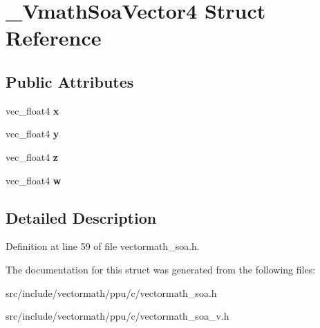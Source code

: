 \hypertarget{struct__VmathSoaVector4}{\section{\-\_\-\-Vmath\-Soa\-Vector4 Struct Reference}
\label{struct__VmathSoaVector4}
}
\subsection*{Public Attributes}
\begin{DoxyCompactItemize}
\item 
\hypertarget{struct__VmathSoaVector4_a9bbac8abd589c01962f89e317f8747fd}{vec\-\_\-float4 {\bfseries x}}\label{struct__VmathSoaVector4_a9bbac8abd589c01962f89e317f8747fd}

\item 
\hypertarget{struct__VmathSoaVector4_a3e08936ccd6f8d727d86be0babf50728}{vec\-\_\-float4 {\bfseries y}}\label{struct__VmathSoaVector4_a3e08936ccd6f8d727d86be0babf50728}

\item 
\hypertarget{struct__VmathSoaVector4_aacf26bee5506ee27362045d93579141e}{vec\-\_\-float4 {\bfseries z}}\label{struct__VmathSoaVector4_aacf26bee5506ee27362045d93579141e}

\item 
\hypertarget{struct__VmathSoaVector4_a9947201bbbd560b6e8422432fcfe9f25}{vec\-\_\-float4 {\bfseries w}}\label{struct__VmathSoaVector4_a9947201bbbd560b6e8422432fcfe9f25}

\end{DoxyCompactItemize}


\subsection{Detailed Description}


Definition at line 59 of file vectormath\-\_\-soa.\-h.



The documentation for this struct was generated from the following files\-:\begin{DoxyCompactItemize}
\item 
src/include/vectormath/ppu/c/vectormath\-\_\-soa.\-h\item 
src/include/vectormath/ppu/c/vectormath\-\_\-soa\-\_\-v.\-h\end{DoxyCompactItemize}
